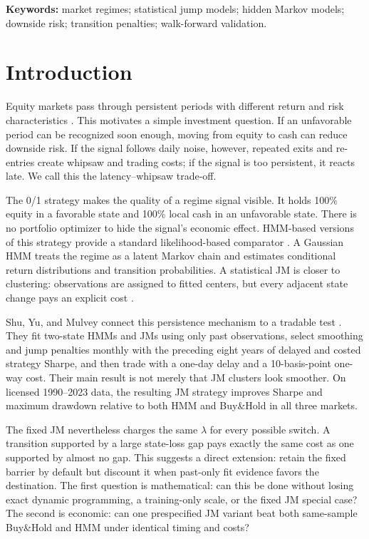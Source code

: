 \documentclass[11pt]{article}
\newcommand{\BH}{Buy\&Hold}
\begin{document}
\noindent\textbf{Keywords:} market regimes; statistical jump models; hidden
Markov models; downside risk; transition penalties; walk-forward validation.

\section{Introduction}

Equity markets pass through persistent periods with different return and risk
characteristics \citep{pagan2003,schwert1989}. This motivates a simple
investment question. If an unfavorable period can be recognized soon enough,
moving from equity to cash can reduce downside risk. If the signal follows daily
noise, however, repeated exits and re-entries create whipsaw and trading costs;
if the signal is too persistent, it reacts late. We call this the
latency--whipsaw trade-off.

The 0/1 strategy makes the quality of a regime signal visible. It holds 100\%
equity in a favorable state and 100\% local cash in an unfavorable state.
There is no portfolio optimizer to hide the signal's economic effect. HMM-based
versions of this strategy provide a standard likelihood-based comparator
\citep{bulla2011}. A Gaussian HMM treats the regime as a latent Markov chain and
estimates conditional return distributions and transition probabilities. A
statistical JM is closer to clustering: observations are assigned to fitted
centers, but every adjacent state change pays an explicit cost
\citep{bemporad2018,nystrup2020persistent}.

Shu, Yu, and Mulvey connect this persistence mechanism to a tradable test
\citep{shu2024}. They fit two-state HMMs and JMs using only past observations,
select smoothing and jump penalties monthly with the preceding eight years of
delayed and costed strategy Sharpe, and then trade with a one-day delay and a
10-basis-point one-way cost. Their main result is not merely that JM clusters
look smoother. On licensed 1990--2023 data, the resulting JM strategy improves
Sharpe and maximum drawdown relative to both HMM and \BH{} in all three
markets.

The fixed JM nevertheless charges the same \(\lambda\) for every possible
switch. A transition supported by a large state-loss gap pays exactly the same
cost as one supported by almost no gap. This suggests a direct extension:
retain the fixed barrier by default but discount it when past-only fit evidence
favors the destination. The first question is mathematical: can this be done
without losing exact dynamic programming, a training-only scale, or the fixed
JM special case? The second is economic: can one prespecified JM variant beat
both same-sample \BH{} and HMM under identical timing and costs?
\end{document}
